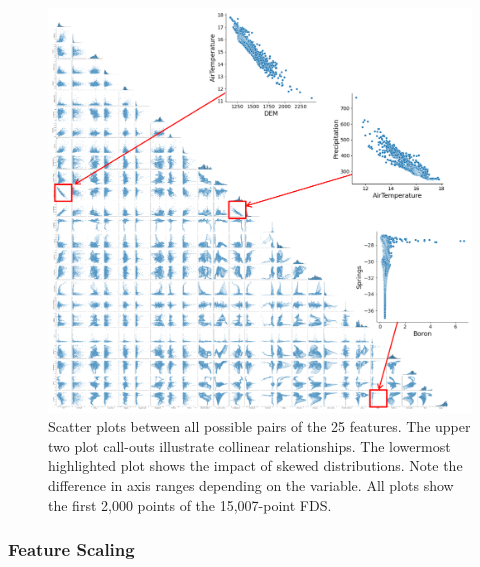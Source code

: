 \begin{figure}[!htp]
\centering
\includegraphics[width=\textwidth]{templates/images/Figure-Scatterplot_Unscaled_Features.png}
\caption[Unscaled FDS scatter plots]{Scatter plots between all possible pairs of the 25 features. The upper two plot call-outs illustrate collinear relationships. The lowermost highlighted plot shows the impact of skewed distributions. Note the difference in axis ranges depending on the variable. All plots show the first 2,000 points of the 15,007-point FDS.}
\label{fig:unscaled_scatter}
\end{figure}

\subsubsection{Feature Scaling}\label{ch3:scaling}

